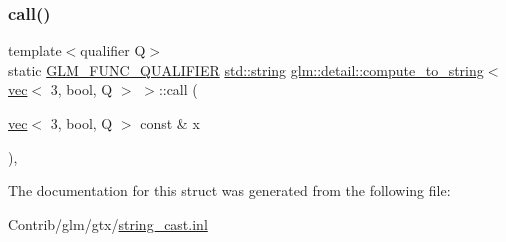 \subsubsection{\texorpdfstring{call()}{call()}}
{\footnotesize\ttfamily template$<$qualifier Q$>$ \\
static \mbox{\hyperlink{setup_8hpp_a33fdea6f91c5f834105f7415e2a64407}{G\+L\+M\+\_\+\+F\+U\+N\+C\+\_\+\+Q\+U\+A\+L\+I\+F\+I\+ER}} \mbox{\hyperlink{_s_d_l__opengl__glext_8h_ae84541b4f3d8e1ea24ec0f466a8c568b}{std\+::string}} \mbox{\hyperlink{structglm_1_1detail_1_1compute__to__string}{glm\+::detail\+::compute\+\_\+to\+\_\+string}}$<$ \mbox{\hyperlink{structglm_1_1vec}{vec}}$<$ 3, bool, Q $>$ $>$\+::call (\begin{DoxyParamCaption}\item[{\mbox{\hyperlink{structglm_1_1vec}{vec}}$<$ 3, bool, Q $>$ const \&}]{x }\end{DoxyParamCaption})\hspace{0.3cm}{\ttfamily [inline]}, {\ttfamily [static]}}



The documentation for this struct was generated from the following file\+:\begin{DoxyCompactItemize}
\item 
Contrib/glm/gtx/\mbox{\hyperlink{string__cast_8inl}{string\+\_\+cast.\+inl}}\end{DoxyCompactItemize}
